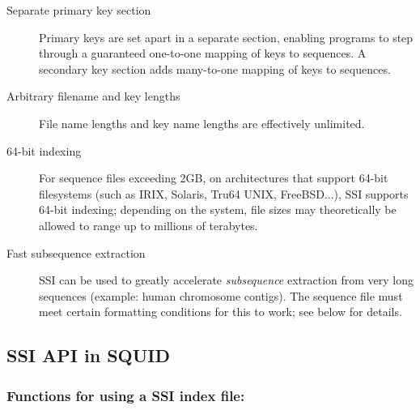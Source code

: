 \documentclass[12pt]{report}
\begin{document}
\begin{description}
\item[Separate primary key section] 
Primary keys are set apart in a separate section, enabling programs to
step through a guaranteed one-to-one mapping of keys to sequences.  A
secondary key section adds many-to-one mapping of keys to sequences.

\item[Arbitrary filename and key lengths]
File name lengths and key name lengths are effectively unlimited. 

\item[64-bit indexing]
For sequence files exceeding 2GB, on architectures that support 64-bit
filesystems (such as IRIX, Solaris, Tru64 UNIX, FreeBSD...), SSI
supports 64-bit indexing; depending on the system, file sizes may 
theoretically be allowed to range up to millions of terabytes.

\item[Fast subsequence extraction]
SSI can be used to greatly accelerate \emph{subsequence} extraction
from very long sequences (example: human chromosome contigs). The
sequence file must meet certain formatting conditions for this to
work; see below for details.
\end{description}

\subsection{SSI API in SQUID}

\subsubsection{Functions for using a SSI index file:}
\end{document}
